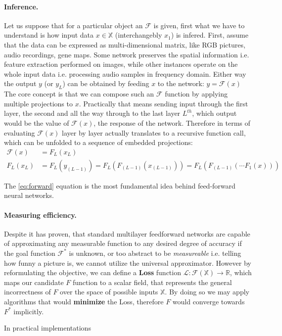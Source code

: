 \paragraph{Inference.}
Let us suppose that for a particular object an $\mathcal{F}$ is given, first what we have to understand is how input data 
$x \in \mathbb{X}$ (interchangebly $x_1$) is infered.
First, assume that the data can be expressed as multi-dimensional matrix, like RGB pictures, audio recordings, gene maps.
Some network preserves the spatial information i.e. feature extraction performed on images, 
while other instances operate on the whole input data i.e. processing audio samples in frequency domain.
Either way the output $y$ (or $y_L$) can be obtained by feeding $x$ to the network: 
$ y = \mathcal{F}(x)$
The core concept is that we can compose such an $\mathcal{F}$ function by applying multiple projections to $x$.
Practically that means sending input through the first layer, the second and all the way through to the last layer $L^{th}$, which output would be the value of $\mathcal{F}(x)$, the response of the network.
Therefore in terms of evaluating $\mathcal{F}(x)$ layer by layer actually translates to a recursive function call, which can be unfolded to a sequence of embedded projections:
\begin{equation}\label{eq:forward}
\begin{split}
    \mathcal{F}(x) & = F_L(x_L) \\
    F_L(x_L) & = F_L(y_{(L-1)}) = F_L(F_{(L-1)}(x_{(L-1)})) = F_L(F_{(L-1)}(\cdots F_1(x)))
\end{split}
\end{equation}

The \ref{eq:forward} equation is the most fundamental idea behind feed-forward neural networks.

\paragraph{Measuring efficiency.}
Despite it has proven, that standard multilayer
feedforward networks are capable of approximating
any measurable function to any desired degree of
accuracy \cite{hornik1989multilayer}
if the goal function $\mathcal{F}^*$ is unknown, 
or too abstract to be \emph{measureable} i.e. telling how funny a picture is, 
we cannot utilize the universal approximator. 
However by reformulating the objective, we can define a \textbf{Loss} function $\mathcal{L}:\mathcal{F}(\mathbb{X}) \rightarrow \mathbb{R}$,
which maps our candidate $F$ function to a scalar field, that represents the general incorrectness of $F$ over the space of possible inputs $\mathbb{X}$.
By doing so we may apply algorithms that would \textbf{minimize} the Loss, therefore $F$ would converge towards $F^*$ implicitly.

In practical implementations 


